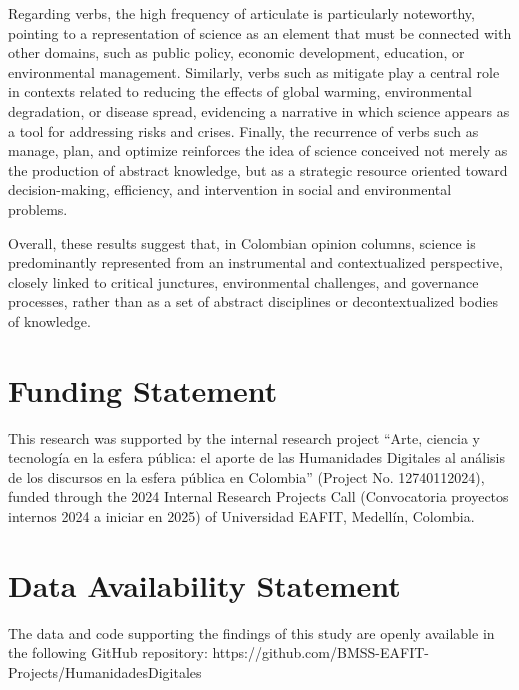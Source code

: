\documentclass[11pt,a4paper]{article}
\begin{document}
Regarding verbs, the high frequency of articulate is particularly noteworthy, pointing to a representation of science as an element that must be connected with other domains, such as public policy, economic development, education, or environmental management. Similarly, verbs such as mitigate play a central role in contexts related to reducing the effects of global warming, environmental degradation, or disease spread, evidencing a narrative in which science appears as a tool for addressing risks and crises. Finally, the recurrence of verbs such as manage, plan, and optimize reinforces the idea of science conceived not merely as the production of abstract knowledge, but as a strategic resource oriented toward decision-making, efficiency, and intervention in social and environmental problems.


Overall, these results suggest that, in Colombian opinion columns, science is predominantly represented from an instrumental and contextualized perspective, closely linked to critical junctures, environmental challenges, and governance processes, rather than as a set of abstract disciplines or decontextualized bodies of knowledge.

	


	\section*{Funding Statement}
	
	This research was supported by the internal research project “Arte, ciencia y tecnología en la esfera pública: el aporte de las Humanidades Digitales al análisis de los discursos en la esfera pública en Colombia” (Project No. 12740112024), funded through the 2024 Internal Research Projects Call (Convocatoria proyectos internos 2024 a iniciar en 2025) of Universidad EAFIT, Medellín, Colombia.
	
	\section*{Data Availability Statement}
	The data and code supporting the findings of this study are openly available in the following GitHub repository:
	https://github.com/BMSS-EAFIT-Projects/HumanidadesDigitales
	
\end{document}
